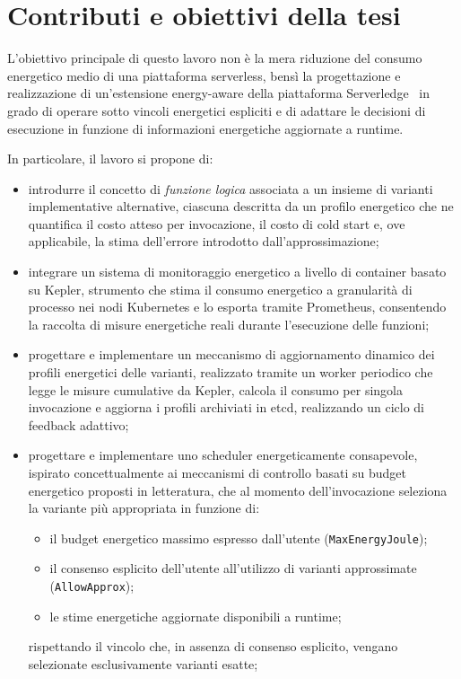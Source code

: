 \section{Contributi e obiettivi della tesi}
\label{sec:contributi_obiettivi}

L'obiettivo principale di questo lavoro non è la mera riduzione
del consumo energetico medio di una piattaforma serverless, bensì
la progettazione e realizzazione di un'estensione energy-aware della
piattaforma Serverledge~\cite{Russo2023_Serverledge} in grado di
operare sotto vincoli energetici espliciti e di adattare le decisioni
di esecuzione in funzione di informazioni energetiche aggiornate
a runtime.

In particolare, il lavoro si propone di:

\begin{itemize}

  \item introdurre il concetto di \emph{funzione logica} associata
  a un insieme di varianti implementative alternative, ciascuna
  descritta da un profilo energetico che ne quantifica il costo
  atteso per invocazione, il costo di cold start e, ove applicabile,
  la stima dell'errore introdotto dall'approssimazione;

  \item integrare un sistema di monitoraggio energetico a livello
  di container basato su Kepler, strumento che stima il consumo
  energetico a granularità di processo nei nodi Kubernetes e
  lo esporta tramite Prometheus, consentendo la raccolta di
  misure energetiche reali durante l'esecuzione delle funzioni;

  \item progettare e implementare un meccanismo di aggiornamento
  dinamico dei profili energetici delle varianti, realizzato tramite
  un worker periodico che legge le misure cumulative da Kepler,
  calcola il consumo per singola invocazione e aggiorna i profili
  archiviati in etcd, realizzando un ciclo di feedback adattivo;

  \item progettare e implementare uno scheduler energeticamente
  consapevole, ispirato concettualmente ai meccanismi di controllo
  basati su budget energetico proposti in letteratura, che al momento
  dell'invocazione seleziona la variante più appropriata in funzione
  di:
    \begin{itemize}
      \item il budget energetico massimo espresso dall'utente
            (\texttt{MaxEnergyJoule});
      \item il consenso esplicito dell'utente all'utilizzo di
            varianti approssimate (\texttt{AllowApprox});
      \item le stime energetiche aggiornate disponibili a runtime;
    \end{itemize}
  rispettando il vincolo che, in assenza di consenso esplicito,
  vengano selezionate esclusivamente varianti esatte;


\end{itemize}
